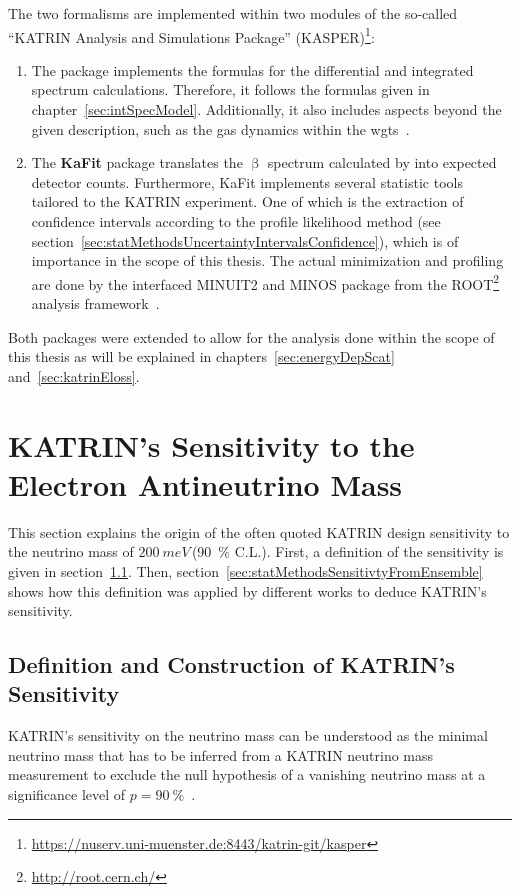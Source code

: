 The two formalisms are implemented within two modules of the so-called ``KATRIN Analysis and Simulations Package'' (KASPER)\footnote{\url{https://nuserv.uni-muenster.de:8443/katrin-git/kasper}}:
\begin{enumerate}
	\item The \textbf{} package implements the formulas for the differential and integrated spectrum calculations. Therefore, it follows the formulas given in chapter~\ref{sec:intSpecModel}. Additionally, it also includes aspects beyond the given description, such as the gas dynamics within the \gls{wgts}~\cite{Hoetzel2012, Groh2015, Kleesiek2019, Kaefer2012}.
	\item The \textbf{KaFit} package translates the $\upbeta$ spectrum calculated by  into expected detector counts. Furthermore, KaFit implements several statistic tools tailored to the KATRIN experiment. One of which is the extraction of confidence intervals according to the profile likelihood method (see section~\ref{sec:statMethodsUncertaintyIntervalsConfidence}), which is of importance in the scope of this thesis. The actual minimization and profiling are done by the interfaced MINUIT2 and MINOS package from the ROOT\footnote{\url{http://root.cern.ch/}}~\cite{ANTCHEVA2009} analysis framework~\cite{Kleesiek2014}.
\end{enumerate}

Both packages were extended to allow for the analysis done within the scope of this thesis as will be explained in chapters~\ref{sec:energyDepScat} and~\ref{sec:katrinEloss}.




\section{KATRIN's Sensitivity to the Electron Antineutrino Mass}
\label{sec:statMethodsKatrinSensitivity}
This section explains the origin of the often quoted KATRIN design sensitivity to the neutrino mass of $\SI{200}{meV}$\,(\SI{90}{\percent} C.L.). First, a definition of the sensitivity is given in section~\ref{sec:statMethodsSensitivtyDef}. Then, section~\ref{sec:statMethodsSensitivtyFromEnsemble} shows how this definition was applied by different works to deduce KATRIN's sensitivity.

\subsection{Definition and Construction of KATRIN's Sensitivity}
\label{sec:statMethodsSensitivtyDef}
KATRIN's sensitivity on the neutrino mass can be understood as the minimal neutrino mass that has to be inferred from a KATRIN neutrino mass measurement to exclude the null hypothesis of a vanishing neutrino mass at a significance level of $p=\SI{90}{\percent}$~\cite{Kleesiek2014,Angrik:2005ep}.

